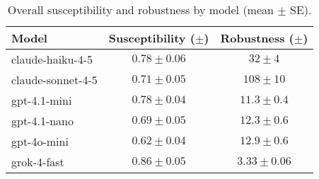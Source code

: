 \begin{table}[t]
  \centering
  \caption{Overall susceptibility and robustness by model (mean $\pm$ SE).}
  \label{tab:summary_by_model}
  \begin{tabular}{lcc}
    \toprule
    Model & Susceptibility ($\pm$) & Robustness ($\pm$) \\
    \midrule
    claude-haiku-4-5 & $0.78\pm 0.06$ & $32\pm 4$ \\
    claude-sonnet-4-5 & $0.71\pm 0.05$ & $108\pm 10$ \\
    gpt-4.1-mini & $0.78\pm 0.04$ & $11.3\pm 0.4$ \\
    gpt-4.1-nano & $0.69\pm 0.05$ & $12.3\pm 0.6$ \\
    gpt-4o-mini & $0.62\pm 0.04$ & $12.9\pm 0.6$ \\
    grok-4-fast & $0.86\pm 0.05$ & $3.33\pm 0.06$ \\
    \bottomrule
  \end{tabular}
\end{table}
